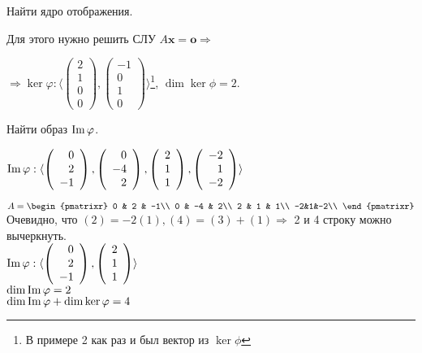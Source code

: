\begin{prim}
	Найти ядро отображения.
\end{prim}
Для этого нужно решить СЛУ $A\textbf{x}=\textbf{o} \Rightarrow$

$\Rightarrow\ker\varphi:\langle \left( \begin{array}{r} %
2\\
1\\
0\\
0
\end{array}\right), \left( \begin{array}{r}
-1\\
0\\
1\\
0
\end{array}\right)\rangle$\footnote{В примере 2 как раз и был вектор из $\ker\phi$}, \quad $\dim\ker\phi=2$.

\begin{prim}
	Найти образ $\operatorname{\mathop{Im}}\varphi$.
\end{prim}
$\operatorname{\mathop{Im}}\varphi : \langle \left( \begin{array}{r}
0\\
2\\
-1
\end{array}\right),\left( \begin{array}{r}
0\\
-4\\
2
\end{array}\right),\left( \begin{array}{r}
2\\
1\\
1
\end{array}\right),\left( \begin{array}{r}
-2\\
1\\
-2
\end{array}\right) \rangle$

$A = \begin{pmatrixr}
0 & 2 & -1\\
0 & -4 & 2\\
2 & 1 & 1\\
-2&1&-2\\ \end{pmatrixr}$ \\
Очевидно, что $(2) = -2(1), (4) = (3)+(1) \Rightarrow$ 2 и 4 строку можно вычеркнуть. \\
$\operatorname{\mathop{Im}}\varphi :\langle \left( \begin{array}{r}
0\\
2\\
-1
\end{array}\right), \left( \begin{array}{r}
2\\
1\\
1
\end{array}\right) \rangle$\\
$\dim \operatorname{\mathop{Im}}\varphi = 2$\\
$\dim \operatorname{\mathop{Im}} \varphi +\dim \ker \varphi =4$




